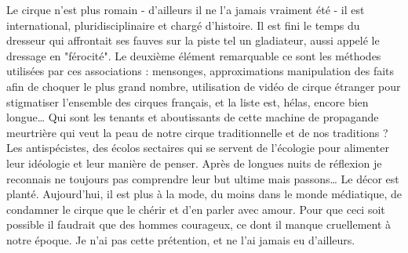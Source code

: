 Le cirque n’est plus romain - d’ailleurs il ne l’a jamais vraiment été - il est international, pluridisciplinaire et chargé d’histoire. Il est fini le temps du dresseur qui affrontait ses fauves sur la piste tel un gladiateur, aussi appelé le dressage en "férocité". Le deuxième élément remarquable ce sont les méthodes utilisées par ces associations : mensonges, approximations manipulation des faits afin de choquer le plus grand nombre, utilisation de vidéo de cirque étranger pour stigmatiser l’ensemble des cirques français, et la liste est, hélas, encore bien longue… Qui sont les tenants et aboutissants de cette machine de propagande meurtrière qui veut la peau de notre cirque traditionnelle et de nos traditions ?  Les antispécistes, des écolos sectaires qui se servent de l’écologie pour alimenter leur idéologie et leur manière de penser. Après de longues nuits de réflexion je reconnais ne toujours pas comprendre leur but ultime mais passons… Le décor est planté. Aujourd’hui, il est plus à la mode, du moins dans le monde médiatique, de condamner le cirque que le chérir et d’en parler avec amour. Pour que ceci soit possible il faudrait que des hommes courageux, ce dont il manque cruellement à notre époque. Je n’ai pas cette prétention, et ne l’ai jamais eu d’ailleurs. 
